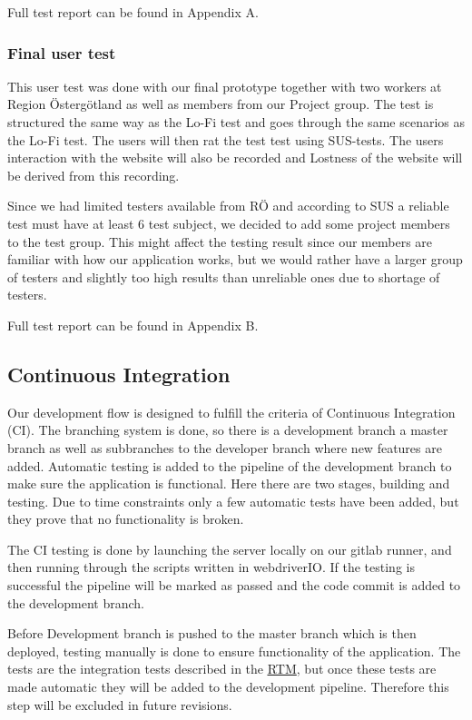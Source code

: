 Full test report can be found in Appendix A.
\subsubsection{Final user test}
This user test was done with our final prototype together with two workers at Region Östergötland as well as members from our Project group. The test is structured the same way as the Lo-Fi test and goes through the same scenarios as the Lo-Fi test. The users will then rat the test test using SUS-tests. The users interaction with the website will also be recorded and Lostness of the website will be derived from this recording. 

Since we had limited testers available from RÖ and according to SUS a reliable test must have at least 6 test subject, we decided to add some project members to the test group. This might affect the testing result since our members are familiar with how our application works, but we would rather have a larger group of testers and slightly too high results than unreliable ones due to shortage of testers. 

Full test report can be found in Appendix B.
\subsection{Continuous Integration}
Our development flow is designed to fulfill the criteria of Continuous Integration (CI). The branching system is done, so there is a development branch a master branch as well as subbranches to the developer branch where new features are added. Automatic testing is added to the pipeline of the development branch to make sure the application is functional. Here there are two stages, building and testing. Due to time constraints only a few automatic tests have been added, but they prove that no functionality is broken. 

The CI testing is done by launching the server locally on our gitlab runner, and then running through the scripts written in webdriverIO. If the testing is successful the pipeline will be marked as passed and the code commit is added to the development branch.

Before Development branch is pushed to the master branch which is then deployed, testing manually is done to ensure functionality of the application. The tests are the integration tests described in the \href{https://gitlab.liu.se/tddc88-company-3-2020/deploy/-/tree/Document_branch/RTM}{\underline RTM}, but once these tests are made automatic they will be added to the development pipeline. Therefore this step will be excluded in future revisions.

